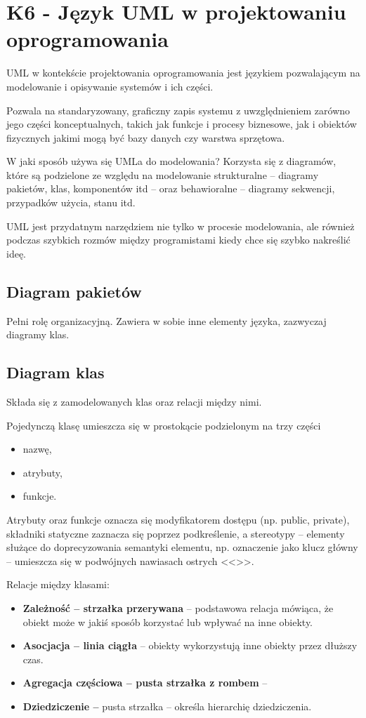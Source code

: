 \section{K6 - Język UML w projektowaniu oprogramowania}

UML w kontekście projektowania oprogramowania jest językiem pozwalającym na modelowanie i opisywanie systemów i ich części.

Pozwala na standaryzowany, graficzny zapis systemu z uwzględnieniem zarówno jego części konceptualnych, takich jak funkcje i procesy biznesowe, jak i obiektów fizycznych jakimi mogą być bazy danych czy warstwa sprzętowa.

W jaki sposób używa się UMLa do modelowania? Korzysta się z diagramów, które są podzielone ze względu na modelowanie strukturalne -- diagramy pakietów, klas, komponentów itd -- oraz behawioralne -- diagramy sekwencji, przypadków użycia, stanu itd.

UML jest przydatnym narzędziem nie tylko w procesie modelowania, ale również podczas szybkich rozmów między programistami kiedy chce się szybko nakreślić ideę.

\subsection{Diagram pakietów}
Pełni rolę organizacyjną. Zawiera w sobie inne elementy języka, zazwyczaj diagramy klas.

\subsection{Diagram klas}
Składa się z zamodelowanych klas oraz relacji między nimi.

Pojedynczą klasę umieszcza się w prostokącie podzielonym na trzy części
\begin{itemize}
	\item{nazwę,}
	\item{atrybuty,}
	\item{funkcje.}
\end{itemize}

Atrybuty oraz funkcje oznacza się modyfikatorem dostępu (np. public, private), składniki statyczne zaznacza się poprzez podkreślenie, a stereotypy -- elementy służące do doprecyzowania semantyki elementu, np. oznaczenie jako klucz główny -- umieszcza się w podwójnych nawiasach ostrych <<>>.

Relacje między klasami:
\begin{itemize}
	\item{\textbf{Zależność -- strzałka przerywana} -- podstawowa relacja mówiąca, że obiekt może w jakiś sposób korzystać lub wpływać na inne obiekty.}
	\item{\textbf{Asocjacja -- linia ciągła} -- obiekty wykorzystują inne obiekty przez dłuższy czas.}
	\item{\textbf{Agregacja częściowa -- pusta strzałka z rombem} -- }
	\item{\textbf{Dziedziczenie --} pusta strzałka -- określa hierarchię dziedziczenia.}
\end{itemize}
